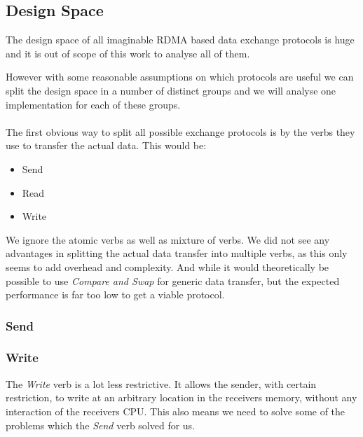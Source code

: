 


\subsection{Design Space}

The design space of all imaginable RDMA based data exchange protocols is huge and it is out of scope of this work to 
analyse all of them. 

However with some reasonable assumptions on which protocols are useful we can split the design space 
in a number of distinct groups and we will analyse one implementation for each of these groups.


\paragraph{} The first obvious way to split all possible exchange protocols is by the verbs they use to transfer the actual data. 
This would be:
\begin{itemize}
  \item Send
  \item Read
  \item Write
\end{itemize}
We ignore the atomic verbs as well as mixture of verbs. We did not see any advantages in splitting the actual data transfer 
into multiple verbs, as this only seems to add overhead and complexity. And while it would theoretically be possible to use
\emph{Compare and Swap} for generic data transfer, but the expected performance is far too low to get a viable protocol.


\subsubsection{Send}

\subsubsection{Write}
The \emph{Write} verb is a lot less restrictive. It allows the sender, with certain restriction, to write at an arbitrary 
location in the receivers memory, without any interaction of the receivers CPU. This also means we need to solve some of the 
problems which the \emph{Send} verb solved for us.

